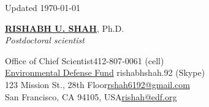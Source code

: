 \documentclass{article}
\begin{document}
\begin{flushright}
Updated \today
\end{flushright}
\begin{center}
\href{https://www.linkedin.com/pub/rishabh-shah/46/962/361}{\Large \textbf{RISHABH U. SHAH}}, Ph.D.\\\textit{Postdoctoral scientist}
\end{center}
\vspace{-2.5mm}
Office of Chief Scientist\hfill 412-807-0061 (cell)\\\href{https://www.edf.org/}{Environmental Defense Fund}
\hfill rishabhshah.92 (Skype)\\123 Mission St., 28th Floor\hfill \href{mailto:rshah6192@gmail.com}{rshah6192@gmail.com}\\San Francisco, CA 94105, USA\hfill \href{mailto:rishah@edf.org}{rishah@edf.org}
\newline
\vspace{5mm}
\end{document}
